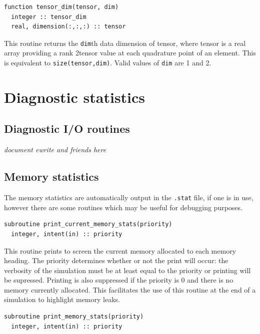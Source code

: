 \documentclass[a4paper, 11pt]{book}
\begin{document}
\begin{lstlisting}
function tensor_dim(tensor, dim)
  integer :: tensor_dim
  real, dimension(:,:,:) :: tensor
\end{lstlisting}

This routine returns the \lstinline+dim+th data dimension of tensor, where
tensor is a real array providing a rank 2tensor value at each quadrature
point of an element.  This is equivalent to \lstinline+size(tensor,dim)+.
Valid values of \lstinline+dim+ are 1 and 2.



\chapter{Diagnostic statistics}

\section{Diagnostic I/O routines}

\textit{document ewrite and friends here}

\section{Memory statistics}

The memory statistics are automatically output in the \lstinline+.stat+ file, if one is
in use, however there are some routines which may be useful for debugging
purposes.


\begin{lstlisting}
subroutine print_current_memory_stats(priority)
  integer, intent(in) :: priority
\end{lstlisting}

This routine prints to screen the current memory allocated to each memory
heading. The priority determines whether or not the print will occur: the
verbosity of the simulation must be at least equal to the priority or
printing will be supressed. Printing is also suppressed if the priority is 0
and there is no memory currently allocated. This facilitates the use of this
routine at the end of a simulation to highlight memory leaks.


\begin{lstlisting}
subroutine print_memory_stats(priority)
  integer, intent(in) :: priority
\end{lstlisting}
\end{document}
